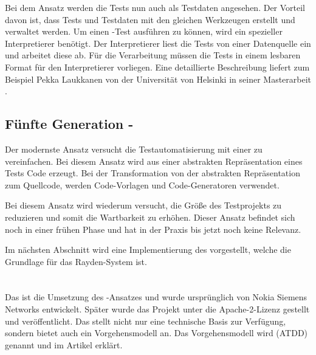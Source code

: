 \SuperPar
Bei dem Ansatz  werden die Tests nun auch als Testdaten angesehen. Der Vorteil davon ist, dass Tests und Testdaten mit den gleichen Werkzeugen erstellt und verwaltet werden. Um einen -Test ausführen zu können, wird ein spezieller Interpretierer benötigt. Der Interpretierer liest die Tests von einer Datenquelle ein und arbeitet diese ab. Für die Verarbeitung müssen die Tests in einem lesbaren Format für den Interpretierer vorliegen. Eine detaillierte Beschreibung liefert zum Beispiel Pekka Laukkanen von der Universität von Helsinki in seiner Masterarbeit \cite{Lauk06}. 

\subsection{Fünfte Generation - }

Der modernste Ansatz versucht die Testautomatisierung mit einer  zu vereinfachen. Bei diesem Ansatz wird aus einer abstrakten Repräsentation eines Tests Code erzeugt. Bei der Transformation von der abstrakten Repräsentation zum Quellcode, werden Code-Vorlagen und Code-Generatoren verwendet.

\SuperPar
Bei diesem Ansatz wird wiederum versucht, die Größe des Testprojekts zu reduzieren und somit die Wartbarkeit zu erhöhen. Dieser Ansatz befindet sich noch in einer frühen Phase und hat in der Praxis bis jetzt noch keine Relevanz. 

\SuperPar
Im nächsten Abschnitt wird eine Implementierung des  vorgestellt, welche die Grundlage für das Rayden-System ist.

\section{}

Das  \cite{Robot} ist die Umsetzung des -Ansatzes und wurde ursprünglich von Nokia Siemens Networks entwickelt. Später wurde das Projekt unter die Apache-2-Lizenz gestellt und veröffentlicht. Das  stellt nicht nur eine technische Basis zur Verfügung, sondern bietet auch ein Vorgehensmodell an. Das Vorgehensmodell wird  (ATDD) genannt und im Artikel  \cite{Lar10} erklärt.

